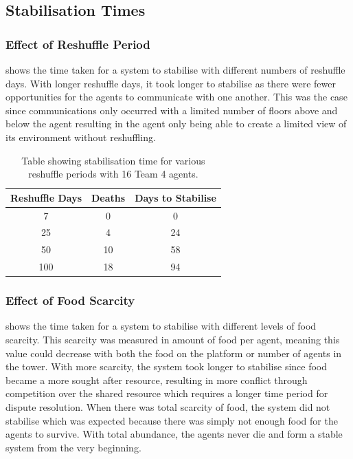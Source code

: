 \subsection{Stabilisation Times}

\subsubsection{Effect of Reshuffle Period}
 shows the time taken for a system to stabilise with different numbers of reshuffle days. With longer reshuffle days, it took longer to stabilise as there were fewer opportunities for the agents to communicate with one another. This was the case since communications only occurred with a limited number of floors above and below the agent resulting in the agent only being able to create a limited view of its environment without reshuffling. 

\begin{table}[htb]
    \centering
    \begin{tabular}{|c|c|c|}
    \hline
    Reshuffle Days & Deaths & Days to Stabilise\\
        \hline
        \hline
        7 & 0 & 0 \\
        \hline
        25 & 4 & 24 \\
        \hline
        50 & 10 & 58 \\
        \hline
        100 & 18 & 94 \\
        \hline
    \end{tabular}
    \caption{Table showing stabilisation time for various reshuffle periods with 16 Team 4 agents.}
    \label{tab:reshuffleStabilisationTimes}
\end{table}

\subsubsection{Effect of Food Scarcity}
 shows the time taken for a system to stabilise with different levels of food scarcity. This scarcity was measured in amount of food per agent, meaning this value could decrease with both the food on the platform or number of agents in the tower. With more scarcity, the system took longer to stabilise since food became a more sought after resource, resulting in more conflict through competition over the shared resource which requires a longer time period for dispute resolution. When there was total scarcity of food, the system did not stabilise which was expected because there was simply not enough food for the agents to survive. With total abundance, the agents never die and form a stable system from the very beginning.


